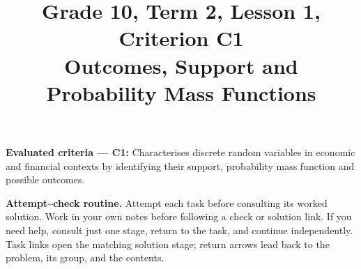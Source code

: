 
\usepackage{needspace}
\setlength{\emergencystretch}{2em}
\title{Grade 10, Term 2, Lesson 1, Criterion C1\\Outcomes, Support and Probability Mass Functions}
\author{}
\date{}
\newcommand{\taskheading}[1]{%
    \textbf{Task #1. \ifcase#1\or
    Identify the outcomes and their probabilities.\or
    Define variables and units; map, list support, build and check PMFs.\or
    Find and interpret a requested probability.\fi}%
}
\newcommand{\problemTasks}[5]{%
    \Needspace{10\baselineskip}%
    \QuestionsTasks[#1]{%
        {1}/{#2-1}/{\taskheading{1} #3},
        {1}/{#2-2}/{\taskheading{2} #4},
        {1}/{#2-3}/{\taskheading{3} #5}%
    }%
}
\newcommand{\contextTasks}[4]{%
    \TaskHyperref{#1-1}{\taskheading{1}} #2\par\smallskip
    \TaskHyperref{#1-2}{\taskheading{2}} #3\par\smallskip
    \TaskHyperref{#1-3}{\taskheading{3}} #4%
}
\newcommand{\workedsolution}[1]{%
    \Needspace{8\baselineskip}%
    \subsubsection*{Complete worked solution}\label{#1}%
}
\newcommand{\solutiontask}[2]{%
    \par\medskip\Needspace{5\baselineskip}\phantomsection\label{#1-#2}%
    \noindent\taskheading{#2}\par\nopagebreak
}

\maketitle
\vspace{-2\baselineskip}
\textbf{Evaluated criteria --- C1:} Characterises discrete random variables in economic and financial contexts by identifying their support, probability mass function and possible outcomes.

\medskip
\textbf{Attempt--check routine.} Attempt each task before consulting its worked solution. Work in your own notes before following a check or solution link. If you need help, consult just one stage, return to the task, and continue independently. Task links open the matching solution stage; return arrows lead back to the problem, its group, and the contents.


